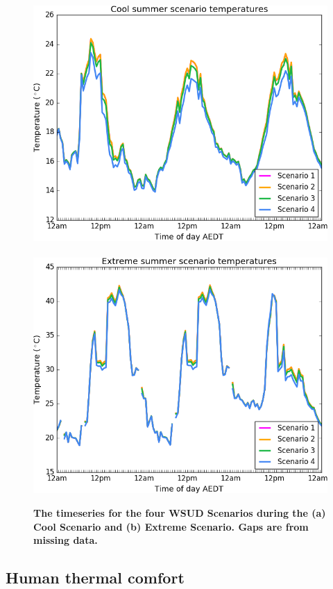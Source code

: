 \documentclass[final,3p,times,authoryear]{elsarticle}
\begin{document}
\begin{figure}[!htbp]
\centering   
\includegraphics[scale=0.40]{images/fig3a}
~
\includegraphics[scale=0.40]{images/fig3b} 
\caption{\bf The timeseries for the four WSUD Scenarios during the (a) Cool Scenario and (b) Extreme Scenario. Gaps are from missing data.}    
 \label{fig:fig3} 
\end{figure} 




\subsection{Human thermal comfort}\label{sec:5}
\end{document}
